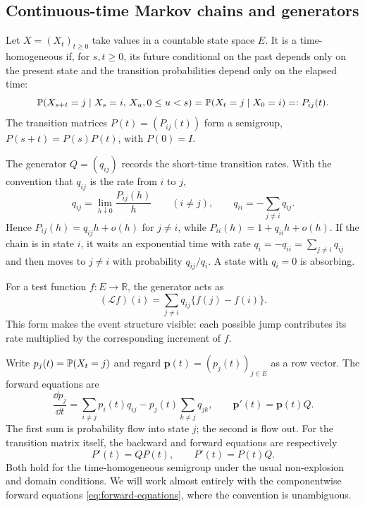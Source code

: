 \subsection{Continuous-time Markov chains and generators}

Let \(X=(X_t)_{t\geq0}\) take values in a countable state space \(E\).  It is a
time-homogeneous \ctmc{} if, for \(s,t\geq0\), its future conditional on the past
depends only on the present state and the transition probabilities depend only on
the elapsed time:
\begin{equation}
  \mathbb{P}(X_{s+t}=j\mid X_s=i,\,X_u,0\leq u<s)
  =\mathbb{P}(X_t=j\mid X_0=i)=:P_{ij}(t).
  \label{eq:markov-property}
\end{equation}
The transition matrices \(P(t)=(P_{ij}(t))\) form a semigroup,
\(P(s+t)=P(s)P(t)\), with \(P(0)=I\).

The generator \(Q=(q_{ij})\) records the short-time transition rates.  With the
convention that \(q_{ij}\) is the rate from \(i\) to \(j\),
\begin{equation}
  q_{ij}=\lim_{h\downarrow0}\frac{P_{ij}(h)}{h}\qquad(i\neq j),
  \qquad
  q_{ii}=-\sum_{j\neq i}q_{ij}.
  \label{eq:generator}
\end{equation}
Hence \(P_{ij}(h)=q_{ij}h+o(h)\) for \(j\neq i\), while
\(P_{ii}(h)=1+q_{ii}h+o(h)\).  If the chain is in state \(i\), it waits an
exponential time with rate
\(q_i=-q_{ii}=\sum_{j\neq i}q_{ij}\) and then moves to \(j\neq i\) with
probability \(q_{ij}/q_i\).  A state with \(q_i=0\) is absorbing.

For a test function \(f:E\to\mathbb R\), the generator acts as
\begin{equation}
  (\mathcal Lf)(i)=\sum_{j\neq i}q_{ij}\{f(j)-f(i)\}.
  \label{eq:generator-action}
\end{equation}
This form makes the event structure visible: each possible jump contributes its
rate multiplied by the corresponding increment of \(f\).

Write \(p_j(t)=\mathbb{P}(X_t=j)\) and regard
\(\boldsymbol p(t)=(p_j(t))_{j\in E}\) as a row vector.  The forward equations are
\begin{equation}
  \frac{\dd p_j}{\dd t}
  =\sum_{i\neq j}p_i(t)q_{ij}-p_j(t)\sum_{k\neq j}q_{jk},
  \qquad
  \boldsymbol p'(t)=\boldsymbol p(t)Q.
  \label{eq:forward-equations}
\end{equation}
The first sum is probability flow into state \(j\); the second is flow out.  For the
transition matrix itself, the backward and forward equations are respectively
\begin{equation}
  P'(t)=QP(t),
  \qquad
  P'(t)=P(t)Q.
  \label{eq:kolmogorov-matrix}
\end{equation}
Both hold for the time-homogeneous semigroup under the usual non-explosion and
domain conditions.  We will work almost entirely with the componentwise forward
equations \cref{eq:forward-equations}, where the convention is unambiguous.

